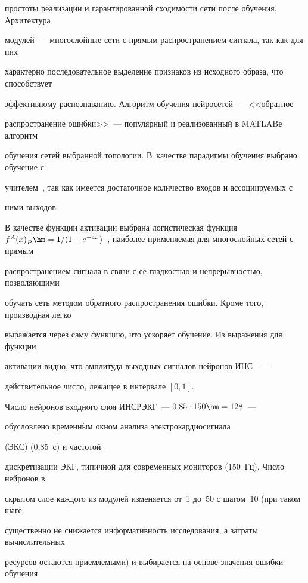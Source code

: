 простоты реализации и гарантированной сходимости сети после обучения. Архитектура


модулей~--- многослойные сети с прямым распространением сигнала, так как для них


характерно последовательное выделение признаков из исходного образа, что способствует


эффективному распознаванию. Алгоритм обучения нейросетей~--- <<обратное


распространение ошибки>>~--- популярный и реализованный в MATLABе алгоритм


обучения сетей выбранной топологии. В~качестве парадигмы обучения выбрано обучение с


учителем~\cite{6-kir}, так как имеется достаточное количество входов и ассоциируемых с


ними выходов.





 В качестве функции активации выбрана логистическая функция ${f^A(x)}_P


\hm= 1/(1+e^{-ax})$~\cite{6-kir}, наиболее применяемая для многослойных сетей с прямым


распространением сигнала в связи с ее гладкостью и непрерывностью, позволяющими


обучать сеть методом обратного распространения ошибки. Кроме того, производная легко


выражается через саму функцию, что ускоряет обучение. Из выражения для функции


активации видно, что амплитуда выходных сигналов нейронов ИНС~\cite{6-kir}~---


действительное число, лежащее в интервале $[0,1]$.





 Число нейронов входного слоя ИНСРЭКГ~--- $0{,}85\cdot 150\hm= 128$~---


обуслов\-ле\-но временн$\acute{\mbox{ы}}$м окном анализа электрокардиосигнала


(ЭКС) (0,85~с) и частотой


дискретизации ЭКГ, типичной для современных мониторов (150~Гц). Число нейронов в


скрытом слое каждого из модулей изменяется от~1 до~50 с шагом~10 (при таком шаге


существенно не снижается информативность исследования, а затраты вычислительных


ресурсов остаются приемлемыми) и выбирается на основе значения ошибки обучения


